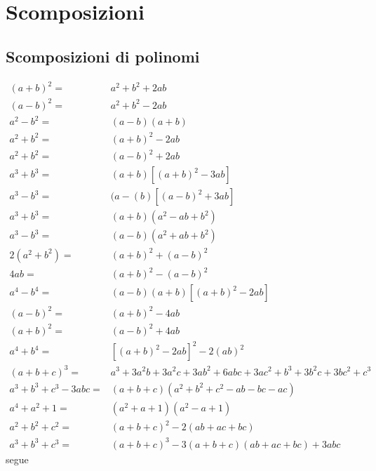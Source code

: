 \chapter{Scomposizioni}\label{ch:scomposizioni}
\section{Scomposizioni di polinomi}
\begin{thm}\label{thm:scomposizioni}
\begin{align}
(a+b)^2=&{}a^2+b^2+2ab\\
(a-b)^2=&{}a^2+b^2-2ab\\
a^2-b^2=&{}(a-b)(a+b)\\
a^2+b^2=&{}(a+b)^2-2ab\\
a^2+b^2=&{}(a-b)^2+2ab\\
a^3+b^3=&{}(a+b)[(a+b)^2-3ab]\label{eq:ascomp1}\\
a^3-b^3=&{}(a-(b)[(a-b)^2+3ab]\label{eq:ascomp2}\\
a^3+b^3=&{}(a+b)(a^2-ab+b^2)\label{eq:ascomp3}\\
a^3-b^3=&{}(a-b)(a^2+ab+b^2)\label{eq:ascomp4}\\
2(a^2+b^2)=&{}(a+b)^2+(a-b)^2\label{eq:ascomp5}\\
4ab=&{}(a+b)^2-(a-b)^2\label{eq:ascomp6}\\
a^4-b^4=&{}(a-b)(a+b)[(a+b)^2-2ab]\label{eq:ascomp7}\\
(a-b)^2=&{}(a+b)^2-4ab\label{eq:ascomp8}\\
(a+b)^2=&{}(a-b)^2+4ab\label{eq:ascomp9}\\
a^4+b^4=&{}[(a+b)^2-2ab]^2-2(ab)^2\label{eq:ascomp10}\\
(a+b+c)^3=&{}a^3 + 3a^2b + 3a^2c + 3ab^2 + 6abc + 3ac^2 + b^3 + 3b^2c + 3bc^2 + c^3\\
a^3+b^3+c^3-3abc=&{}(a+b+c)(a^2+b^2+c^2-ab-bc-ac)\label{eq:ascomp11}\\
a^4+a^2+1=&{}(a^2+a+1)(a^2-a+1)\label{eq:ascomp12}\\
a^2+b^2+c^2=&{}(a+b+c)^2-2(ab+ac+bc)\label{eq:ascomp13}\\
a^3+b^3+c^3=&{}(a+b+c)^3-3(a+b+c)(ab+ac+bc)+3abc\label{eq:ascomp14}
\end{align}
segue
\end{thm}
